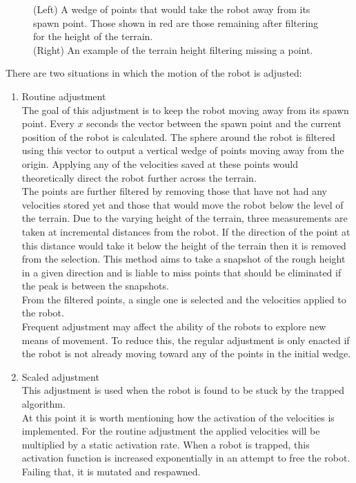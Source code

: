 \documentclass{article}
\begin{document}
\begin{figure}[H]
\begin{minipage}[t]{0.65\textwidth}
\vspace*{-3mm}
\caption{(Left) A wedge of points that would take the robot away from its spawn point. Those shown in red are those remaining after filtering for the height of the terrain.\\
(Right) An example of the terrain height filtering missing a point.} 
\end{minipage}
\end{figure}

\noindent There are two situations in which the motion of the robot is adjusted:
\begin{enumerate}
\item Routine adjustment\\
The goal of this adjustment is to keep the robot moving away from its spawn point. Every $x$ seconds the vector between the spawn point and the current position of the robot is calculated. The sphere around the robot is filtered using this vector to output a vertical wedge of points moving away from the origin. Applying any of the velocities saved at these points would theoretically direct the robot further across the terrain. \\
The points are further filtered by removing those that have not had any velocities stored yet and those that would move the robot below the level of the terrain. Due to the varying height of the terrain, three measurements are taken at incremental distances from the robot. If the direction of the point at this distance would take it below the height of the terrain then it is removed from the selection. This method aims to take a snapshot of the rough height in a given direction and is liable to miss points that should be eliminated if the peak is between the snapshots. \\
From the filtered points, a single one is selected and the velocities applied to the robot. \\
Frequent adjustment may affect the ability of the robots to explore new means of movement. To reduce this, the regular adjustment is only enacted if the robot is not already moving toward any of the points in the initial wedge. 
\item Scaled adjustment\\
This adjustment is used when the robot is found to be stuck by the trapped algorithm.\\
At this point it is worth mentioning how the activation of the velocities is implemented. For the routine adjustment the applied velocities will be multiplied by a static activation rate. When a robot is trapped, this activation function is increased exponentially in an attempt to free the robot. Failing that, it is mutated and respawned. 

\end{enumerate}
\end{document}
